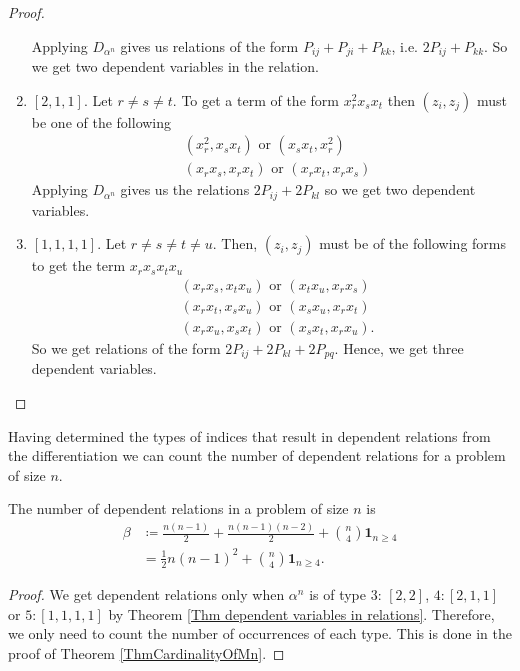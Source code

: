 \documentclass[a4paper,12pt,twoside,BCOR=10mm]{scrbook}
\begin{document}
\begin{theorem}
\begin{proof}
\begin{enumerate}[1:]
    Applying $D_{\alpha^n}$ gives us relations of the form $P_{ij} + P_{ji} + P_{kk}$, i.e. $2P_{ij} + P_{kk}$. So we get two dependent variables in the relation.
    \item $[2, 1, 1]$. Let $r \neq s \neq t$. To get a term of the form $x_r^2 x_s x_t$ then $(z_i, z_j)$ must be one of the following
    \begin{align*}
        &(x_r^2, x_sx_t) \text{ or } (x_sx_t, x_r^2)\\
        &(x_rx_s, x_rx_t) \text{ or } (x_rx_t, x_rx_s)
    \end{align*}
    Applying $D_{\alpha^n}$ gives us the relations $2P_{ij} + 2P_{kl}$ so we get two dependent variables.
    \item $[1,1,1,1]$. Let $r \neq s \neq t \neq u$. Then, $(z_i, z_j)$ must be of the following forms to get the term $x_r x_s x_t x_u$
    \begin{align*}
        &(x_rx_s, x_tx_u) \text{ or } (x_tx_u, x_rx_s)\\
        &(x_rx_t, x_sx_u) \text{ or } (x_sx_u, x_rx_t)\\
        &(x_rx_u, x_sx_t) \text{ or } (x_sx_t, x_rx_u).
    \end{align*}
    So we get relations of the form $2P_{ij} + 2P_{kl} + 2P_{pq}$. Hence, we get three dependent variables.
\end{enumerate}
\end{proof}
\end{theorem}

Having determined the types of indices that result in dependent relations from the differentiation we can count the number of dependent relations for a problem of size $n$.

\begin{corollary}\label{CorNumberOfDependentRelations}
The number of dependent relations in a problem of size $n$ is
\begin{align*}
    \beta &\coloneqq \frac{n(n-1)}{2} + \frac{n(n-1)(n-2)}{2} + \binom{n}{4}\mathbf{1}_{n\geq 4}\\
    &= \frac{1}{2}n(n - 1)^2 + \binom{n}{4}\mathbf{1}_{n\geq 4}.
\end{align*}
\end{corollary}
\begin{proof}
We get dependent relations only when $\alpha^n$ is of type $3:\, [2,2]$, $4: [2,1,1]$ or $5: [1,1,1,1]$ by Theorem \ref{Thm dependent variables in relations}. Therefore, we only need to count the number of occurrences of each type. This is done in the proof of Theorem \ref{ThmCardinalityOfMn}.
\end{proof}
\end{document}
